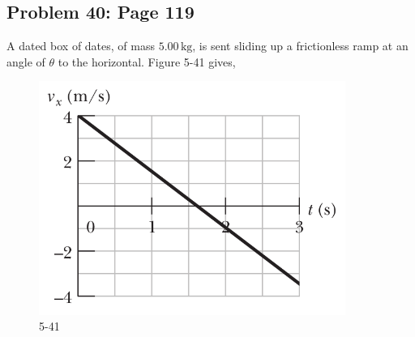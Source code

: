 \documentclass{article}
\begin{document}
    \subsection{Problem 40: Page 119}
    A dated box of dates, of mass $5.00\,\mathrm{kg}$, is sent 
    sliding up a frictionless ramp at an angle of $\theta$ to 
    the horizontal. Figure 5-41 gives,
    \begin{figure}[h!]
        \centering 
        \includegraphics[width=10cm]{Exam1Practice_Figures/force2.png}
        \caption{5-41}
    \end{figure}
\end{document}

